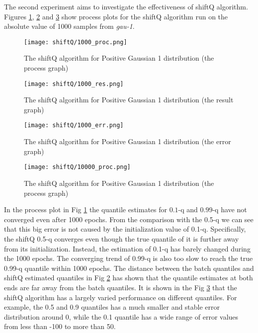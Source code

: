 The second experiment aims to investigate the effectiveness of shiftQ algorithm. Figures \ref{fig: shiftQ_proc}, \ref{fig: shiftQ_res} and \ref{fig: shiftQ_err} show process plots for the shiftQ algorithm run on the absolute value of 1000 samples from \textit{gau-1}.

\begin{figure}[h!]
	\texttt{[image: shiftQ/1000\_proc.png]}
	\caption{The shiftQ algorithm for Positive Gaussian 1 distribution (the process graph)}
    \label{fig: shiftQ_proc}
\end{figure}

\begin{figure}[h!]
	\texttt{[image: shiftQ/1000\_res.png]}
	\caption{The shiftQ algorithm for Positive Gaussian 1 distribution (the result graph)}
    \label{fig: shiftQ_res}
\end{figure}

\begin{figure}[h!]
	\texttt{[image: shiftQ/1000\_err.png]}
	\caption{The shiftQ algorithm for Positive Gaussian 1 distribution (the error graph)}
    \label{fig: shiftQ_err}
\end{figure}

\begin{figure}[h!]
	\texttt{[image: shiftQ/10000\_proc.png]}
	\caption{The shiftQ algorithm for Positive Gaussian 1 distribution (the process graph)}
    \label{fig: shiftQ_proc_10000}
\end{figure}

 In the process plot in Fig \ref{fig: shiftQ_proc} the quantile estimates for $0.1$-q and $0.99$-q have not converged even after 1000 epochs. From the comparison with the 0.5-q we can see that this big error is not caused by the initialization value of 0.1-q. Specifically, the shiftQ 0.5-q converges even though the true quantile of it is further away from its initialization. Instead, the estimation of 0.1-q has barely changed during the 1000 epochs. The converging trend of 0.99-q is also too slow to reach the true 0.99-q quantile within 1000 epochs. The distance between the batch quantiles and shiftQ estimated quantiles in Fig \ref{fig: shiftQ_res} has shown that the quantile estimates at both ends are far away from the batch quantiles. It is shown in the Fig \ref{fig: shiftQ_err} that the shiftQ algorithm has a largely varied performance on different quantiles. For example, the 0.5 and 0.9 quantiles has a much smaller and stable error distribution around 0, while the 0.1 quantile has a wide range of error values from less than -100 to more than 50. 
 
